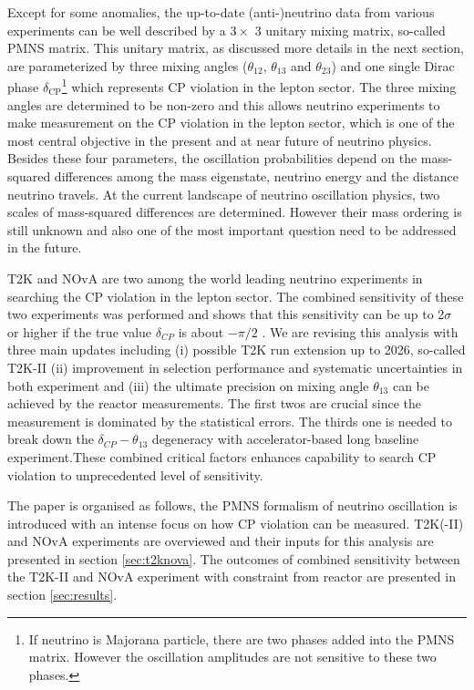 \documentclass[a4 paper,12pt]{report}%
\begin{document}
Except for some anomalies, the up-to-date (anti-)neutrino data from various experiments can be well described by a $3\times$ 3 unitary mixing matrix, so-called PMNS matrix. This unitary matrix, as discussed more details in the next section, are parameterized by three mixing angles ($\theta_{12}$, $\theta_{13}$ and $\theta_{23}$) and one single Dirac phase $\delta_{\text{CP}}$\footnote{If neutrino is Majorana particle, there are two phases added into the PMNS matrix. However the oscillation amplitudes are not sensitive to these two phases.} which represents CP violation in the lepton sector.  The three mixing angles are determined to be non-zero \cite{Patrignani:2016xqp} and this allows neutrino experiments to make measurement on the CP violation in the lepton sector, which is one of the most central objective in the present and at near future of neutrino physics. Besides these four parameters, the oscillation probabilities depend on the mass-squared differences among the mass eigenstate, neutrino energy and the distance neutrino travels. At the current landscape of neutrino oscillation physics, two scales of mass-squared differences are determined. However their mass ordering is still unknown and also one of the most important question need to be addressed in the future.


 T2K and NOvA are two among the world leading neutrino experiments in searching the CP violation in the lepton sector. The combined sensitivity of these two experiments was performed and shows that this sensitivity can be up to 2$\sigma$ or higher if the true value $\delta_{CP}$ is about $-\pi/2$ \cite{Abe:2014tzr}. We are revising this analysis with three main updates including (i) possible T2K run extension up to 2026, so-called T2K-II (ii) improvement in selection performance and systematic uncertainties in both experiment and (iii) the ultimate precision on mixing angle $\theta_{13}$ can be achieved by the reactor measurements. The first twos are crucial since the measurement is dominated by the statistical errors. The thirds one is needed to break down the $\delta_{CP}-\theta_{13}$ degeneracy with accelerator-based long baseline experiment.These combined critical factors enhances capability to search CP violation to unprecedented level of sensitivity.
 

The paper is organised as follows, the PMNS formalism of neutrino oscillation is  introduced with an intense focus on how CP violation can be measured. T2K(-II) and NOvA experiments are overviewed and their inputs for this analysis are presented in section \ref{sec:t2knova}. The  outcomes of combined sensitivity between the T2K-II and NOvA experiment with constraint from reactor are presented in section \ref{sec:results}.\par 
\end{document}
